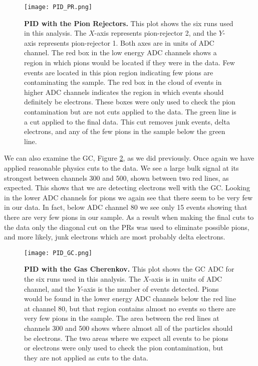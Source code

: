 \begin{figure}[!ht]
\begin{center}
\texttt{[image: PID\_PR.png]}
\end{center}
\caption[PID with the Pion Rejectors]{
{\bf{PID with the Pion Rejectors.}} This plot shows the six runs used in this analysis. The $X$-axis represents pion-rejector 2, and the $Y$-axis represents pion-rejector 1. Both axes are in units of ADC channel. The red box in the low energy ADC channels shows a region in which pions would be located if they were in the data. Few events are located in this pion region indicating few pions are contaminating the sample. The red box in the cloud of events in higher ADC channels indicates the region in which events should definitely be electrons. These boxes were only used to check the pion contamination but are not cuts applied to the data. The green line is a cut applied to the final data. This cut removes junk events, delta electrons, and any of the few pions in the sample below the green line.}
\label{fig:pid_pr}
\end{figure}

We can also examine the GC, Figure \ref{fig:pid_gc}, as we did previously. Once again we have applied reasonable physics cuts to the data. We see a large bulk signal at its strongest between channels 300 and 500, shown between two red lines, as expected. This shows that we are detecting electrons well with the GC. Looking in the lower ADC channels for pions we again see that there seem to be very few in our data. In fact, below ADC channel 80 we see only 15 events showing that there are very few pions in our sample. As a result when making the final cuts to the data only the diagonal cut on the PRs was used to eliminate possible pions, and more likely, junk electrons which are most probably delta electrons.

\begin{figure}[!ht]
\begin{center}
\texttt{[image: PID\_GC.png]}
\end{center}
\caption[PID with the Gas Cherenkov]{
{\bf{PID with the Gas Cherenkov.}} This plot shows the GC ADC for the six runs used in this analysis. The $X$-axis is in units of ADC channel, and the $Y$-axis is the number of events detected. Pions would be found in the lower energy ADC channels below the red line at channel 80, but that region contains almost no events so there are very few pions in the sample. The area between the red lines at channels 300 and 500 shows where almost all of the particles should be electrons. The two areas where we expect all events to be pions or electrons were only used to check the pion contamination, but they are not applied as cuts to the data.}
\label{fig:pid_gc}
\end{figure}

